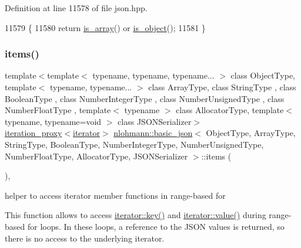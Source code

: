 Definition at line 11578 of file json.\+hpp.


\begin{DoxyCode}
11579     \{
11580         \textcolor{keywordflow}{return} \hyperlink{classnlohmann_1_1basic__json_aef9ce5dd2381caee1f8ddcdb5bdd9c65}{is\_array}() or \hyperlink{classnlohmann_1_1basic__json_af8f511af124e82e4579f444b4175787c}{is\_object}();
11581     \}
\end{DoxyCode}
\mbox{\label{classnlohmann_1_1basic__json_afe3e137ace692efa08590d8df40f58dd}} 
\subsubsection{\texorpdfstring{items()}{items()}\hspace{0.1cm}{\footnotesize\ttfamily [1/2]}}
{\footnotesize\ttfamily template$<$template$<$ typename, typename, typename... $>$ class Object\+Type, template$<$ typename, typename... $>$ class Array\+Type, class String\+Type , class Boolean\+Type , class Number\+Integer\+Type , class Number\+Unsigned\+Type , class Number\+Float\+Type , template$<$ typename $>$ class Allocator\+Type, template$<$ typename, typename=void $>$ class J\+S\+O\+N\+Serializer$>$ \\
\hyperlink{classnlohmann_1_1basic__json_afb49d897bc58d6678f4471925bbfbb01}{iteration\+\_\+proxy}$<$\hyperlink{classnlohmann_1_1basic__json_a099316232c76c034030a38faa6e34dca}{iterator}$>$ \hyperlink{classnlohmann_1_1basic__json}{nlohmann\+::basic\+\_\+json}$<$ Object\+Type, Array\+Type, String\+Type, Boolean\+Type, Number\+Integer\+Type, Number\+Unsigned\+Type, Number\+Float\+Type, Allocator\+Type, J\+S\+O\+N\+Serializer $>$\+::items (\begin{DoxyParamCaption}{ }\end{DoxyParamCaption})\hspace{0.3cm}{\ttfamily [inline]}, {\ttfamily [noexcept]}}



helper to access iterator member functions in range-\/based for 

This function allows to access \hyperlink{classnlohmann_1_1detail_1_1iter__impl_a3a541a223320f6635f2f188ba54f8818}{iterator\+::key()} and \hyperlink{classnlohmann_1_1detail_1_1iter__impl_ab447c50354c6611fa2ae0100ac17845c}{iterator\+::value()} during range-\/based for loops. In these loops, a reference to the J\+S\+ON values is returned, so there is no access to the underlying iterator.

